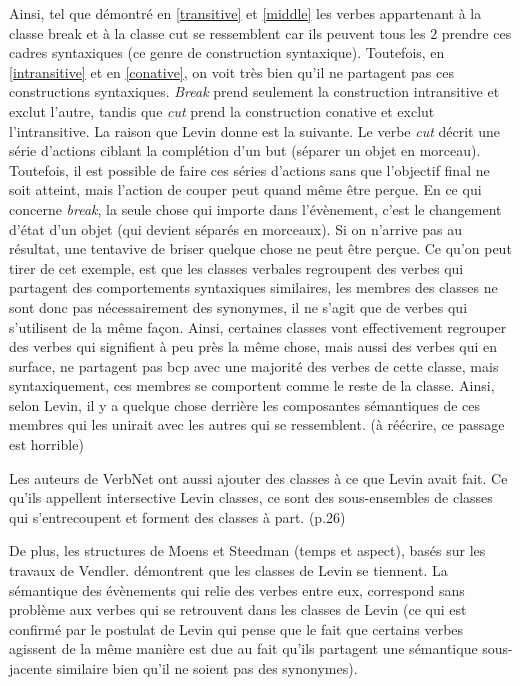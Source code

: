 Ainsi, tel que démontré en \ref{transitive} et \ref{middle} les verbes appartenant à la classe break et à la classe cut se ressemblent car ils peuvent tous les 2 prendre ces cadres syntaxiques (ce genre de construction syntaxique). Toutefois, en \ref{intransitive} et en \ref{conative}, on voit très bien qu'il ne partagent pas ces constructions syntaxiques. \emph{Break} prend seulement la construction intransitive et exclut l'autre, tandis que \emph{cut} prend la construction conative et exclut l'intransitive. La raison que Levin donne est la suivante. Le verbe \emph{cut} décrit une série d'actions ciblant la complétion d'un but (séparer un objet en morceau). Toutefois, il est possible de faire ces séries d'actions sans que l'objectif final ne soit atteint, mais l'action de couper peut quand même être perçue. En ce qui concerne \emph{break}, la seule chose qui importe dans l'évènement, c'est le changement d'état d'un objet (qui devient séparés en morceaux). Si on n'arrive pas au résultat, une tentavive de briser quelque chose ne peut être perçue. Ce qu'on peut tirer de cet exemple, est que les classes verbales regroupent des verbes qui partagent des comportements syntaxiques similaires, les membres des classes ne sont donc pas nécessairement des synonymes, il ne s'agit que de verbes qui s'utilisent de la même façon. Ainsi, certaines classes vont effectivement regrouper des verbes qui signifient à peu près la même chose, mais aussi des verbes qui en surface, ne partagent pas bcp avec une majorité des verbes de cette classe, mais syntaxiquement, ces membres se comportent comme le reste de la classe. Ainsi, selon Levin, il y a quelque chose derrière les composantes sémantiques de ces membres qui les unirait avec les autres qui se ressemblent. (à réécrire, ce passage est horrible)

Les auteurs de VerbNet ont aussi ajouter des classes à ce que Levin avait fait. Ce qu'ils appellent intersective Levin classes, ce sont des sous-ensembles de classes qui s'entrecoupent et forment des classes à part. (p.26)

De plus, les structures de Moens et  Steedman (temps et aspect), basés sur les travaux de Vendler. démontrent que les classes de Levin se tiennent. La sémantique des évènements qui relie des verbes entre eux, correspond sans problème aux verbes qui se retrouvent dans les classes de Levin (ce qui est confirmé par le postulat de Levin qui pense que le fait que certains verbes agissent de la même manière est due au fait qu'ils partagent une sémantique sous-jacente similaire bien qu'il ne soient pas des synonymes).

